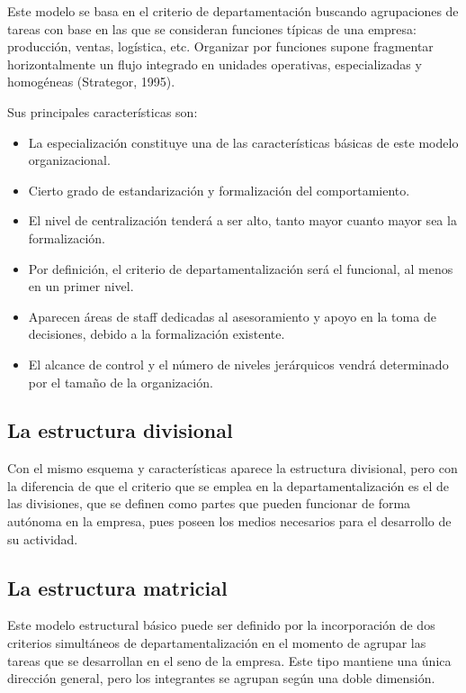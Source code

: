 \documentclass[
]{krantz}
\providecommand{\tightlist}{%
  \setlength{\itemsep}{0pt}\setlength{\parskip}{0pt}}
\begin{document}
Este modelo se basa en el criterio de departamentación buscando agrupaciones de tareas con base en las que se consideran funciones típicas de una empresa: producción, ventas, logística, etc. Organizar por funciones supone fragmentar horizontalmente un flujo integrado en unidades operativas, especializadas y homogéneas (Strategor, 1995).

Sus principales características son:

\begin{itemize}
\tightlist
\item
  La especialización constituye una de las características básicas de este modelo organizacional.
\item
  Cierto grado de estandarización y formalización del comportamiento.
\item
  El nivel de centralización tenderá a ser alto, tanto mayor cuanto mayor sea la formalización.
\item
  Por definición, el criterio de departamentalización será el funcional, al menos en un primer nivel.
\item
  Aparecen áreas de staff dedicadas al asesoramiento y apoyo en la toma de decisiones, debido a la formalización existente.
\item
  El alcance de control y el número de niveles jerárquicos vendrá determinado por el tamaño de la organización.
\end{itemize}

\hypertarget{la-estructura-divisional}{%
\subsection{La estructura divisional}\label{la-estructura-divisional}}

Con el mismo esquema y características aparece la estructura divisional, pero con la diferencia de que el criterio que se emplea en la departamentalización es el de las divisiones, que se definen como partes que pueden funcionar de forma autónoma en la empresa, pues poseen los medios necesarios para el desarrollo de su actividad.

\hypertarget{la-estructura-matricial}{%
\subsection{La estructura matricial}\label{la-estructura-matricial}}

Este modelo estructural básico puede ser definido por la incorporación de dos criterios simultáneos de departamentalización en el momento de agrupar las tareas que se desarrollan en el seno de la empresa. Este tipo mantiene una única dirección general, pero los integrantes se agrupan según una doble dimensión.
\end{document}
